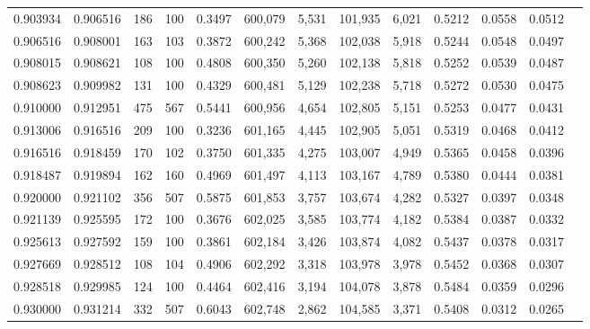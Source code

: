 \begin{tabular}{rrrrrrrrrrrrr}
0.903934 & 0.906516 &   186 & 100 &                                     0.3497 & 600,079 &   5,531 & 101,935 &   6,021 & 0.5212 & 0.0558 & 0.0512 \\
0.906516 & 0.908001 &   163 & 103 &                                     0.3872 & 600,242 &   5,368 & 102,038 &   5,918 & 0.5244 & 0.0548 & 0.0497 \\
0.908015 & 0.908621 &   108 & 100 &                                     0.4808 & 600,350 &   5,260 & 102,138 &   5,818 & 0.5252 & 0.0539 & 0.0487 \\
0.908623 & 0.909982 &   131 & 100 &                                     0.4329 & 600,481 &   5,129 & 102,238 &   5,718 & 0.5272 & 0.0530 & 0.0475 \\
0.910000 & 0.912951 &   475 & 567 &                                     0.5441 & 600,956 &   4,654 & 102,805 &   5,151 & 0.5253 & 0.0477 & 0.0431 \\
0.913006 & 0.916516 &   209 & 100 &                                     0.3236 & 601,165 &   4,445 & 102,905 &   5,051 & 0.5319 & 0.0468 & 0.0412 \\
0.916516 & 0.918459 &   170 & 102 &                                     0.3750 & 601,335 &   4,275 & 103,007 &   4,949 & 0.5365 & 0.0458 & 0.0396 \\
0.918487 & 0.919894 &   162 & 160 &                                     0.4969 & 601,497 &   4,113 & 103,167 &   4,789 & 0.5380 & 0.0444 & 0.0381 \\
0.920000 & 0.921102 &   356 & 507 &                                     0.5875 & 601,853 &   3,757 & 103,674 &   4,282 & 0.5327 & 0.0397 & 0.0348 \\
0.921139 & 0.925595 &   172 & 100 &                                     0.3676 & 602,025 &   3,585 & 103,774 &   4,182 & 0.5384 & 0.0387 & 0.0332 \\
0.925613 & 0.927592 &   159 & 100 &                                     0.3861 & 602,184 &   3,426 & 103,874 &   4,082 & 0.5437 & 0.0378 & 0.0317 \\
0.927669 & 0.928512 &   108 & 104 &                                     0.4906 & 602,292 &   3,318 & 103,978 &   3,978 & 0.5452 & 0.0368 & 0.0307 \\
0.928518 & 0.929985 &   124 & 100 &                                     0.4464 & 602,416 &   3,194 & 104,078 &   3,878 & 0.5484 & 0.0359 & 0.0296 \\
0.930000 & 0.931214 &   332 & 507 &                                     0.6043 & 602,748 &   2,862 & 104,585 &   3,371 & 0.5408 & 0.0312 & 0.0265 \\

\end{tabular}
